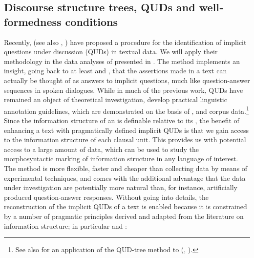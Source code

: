 \documentclass[output=paper,
,modfonts
,nonflat]{langsci/langscibook}
\begin{document}
\subsection{Discourse structure trees, QUDs and well‐formedness conditions}\label{sect:principles}

Recently, \cite{riear18b} (see also \citealt{reyuw16}, \citealt{riear18a}) have proposed a procedure for the identification of implicit questions under discussion (QUDs) in textual data. We will apply their methodology in the data analyses of  presented in . The method implements an insight, going back to at least \cite{stuch89,kupja95,ginjo96a} and \cite{robcr12}, that the assertions made in a text can actually be thought of as answers to implicit questions, much like question-answer sequences in spoken dialogues. While in much of the previous work, QUDs have remained an object of theoretical investigation, \cite{riear18b} develop practical linguistic annotation guidelines, which are demonstrated on the basis of ,  and  corpus data.\footnote{See also  for an application of the QUD-tree method to  (, ).} Since the information structure of an  is definable relative to its , the benefit of enhancing a text with pragmatically defined implicit QUDs is that we gain access to the information structure of each clausal unit. This provides us with potential access to a large amount of data, which can be used to study the morphosyntactic marking of information structure in any language of interest. The method is more flexible, faster and cheaper than collecting data by means of experimental techniques, and comes with the additional advantage that the data under investigation are potentially more natural than, for instance, artificially produced question-answer responses.
Without going into details, the reconstruction of the implicit QUDs of a text is enabled because it is constrained by a number of pragmatic principles derived and adapted from the literature on information structure; in particular \cite{rooma92,schro99,bueda03} and \cite{bueda08}:
 
\end{document}
